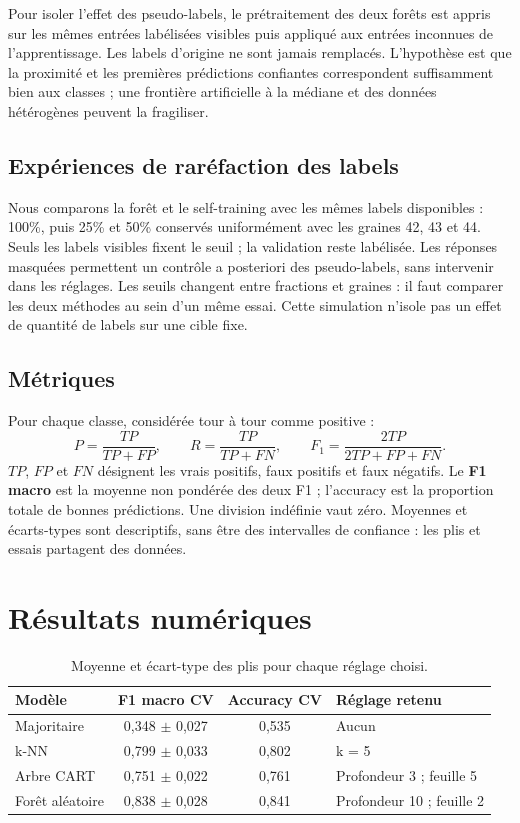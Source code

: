 \documentclass[10pt,a4paper]{article}
\begin{document}
Pour isoler l'effet des pseudo-labels, le prétraitement des deux forêts est appris sur les mêmes entrées labélisées visibles puis appliqué aux entrées inconnues de l'apprentissage. Les labels d'origine ne sont jamais remplacés. L'hypothèse est que la proximité et les premières prédictions confiantes correspondent suffisamment bien aux classes ; une frontière artificielle à la médiane et des données hétérogènes peuvent la fragiliser.

\subsection{Expériences de raréfaction des labels}

Nous comparons la forêt et le self-training avec les mêmes labels disponibles : 100\%, puis 25\% et 50\% conservés uniformément avec les graines 42, 43 et 44. Seuls les labels visibles fixent le seuil ; la validation reste labélisée. Les réponses masquées permettent un contrôle a posteriori des pseudo-labels, sans intervenir dans les réglages. Les seuils changent entre fractions et graines : il faut comparer les deux méthodes au sein d'un même essai. Cette simulation n'isole pas un effet de quantité de labels sur une cible fixe.

\subsection{Métriques}

Pour chaque classe, considérée tour à tour comme positive :\[P=\frac{TP}{TP+FP},\qquad R=\frac{TP}{TP+FN},\qquad F_1=\frac{2TP}{2TP+FP+FN}.\]$TP$, $FP$ et $FN$ désignent les vrais positifs, faux positifs et faux négatifs. Le \textbf{F1 macro} est la moyenne non pondérée des deux F1 ; l'accuracy est la proportion totale de bonnes prédictions. Une division indéfinie vaut zéro. Moyennes et écarts-types sont descriptifs, sans être des intervalles de confiance : les plis et essais partagent des données.

\clearpage

\section{Résultats numériques}

\begin{table}[H]\centering\small
\begin{tabularx}{\linewidth}{lccX}
\toprule
\textbf{Modèle} & \textbf{F1 macro CV} & \textbf{Accuracy CV} & \textbf{Réglage retenu} \\
\midrule
Majoritaire & 0,348 \ensuremath{\pm} 0,027 & 0,535 & Aucun \\
k-NN & 0,799 \ensuremath{\pm} 0,033 & 0,802 & k = 5 \\
Arbre CART & 0,751 \ensuremath{\pm} 0,022 & 0,761 & Profondeur 3 ; feuille 5 \\
Forêt aléatoire & 0,838 \ensuremath{\pm} 0,028 & 0,841 & Profondeur 10 ; feuille 2 \\
\bottomrule
\end{tabularx}
\caption{Moyenne et écart-type des plis pour chaque réglage choisi.}\label{tab:cv}
\end{table}
\end{document}
